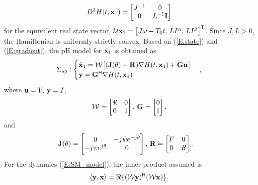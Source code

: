 \begin{equation} \label{E:sg_hessian}
    D^2 H(t, \mathbf{x}_1) = \begin{bmatrix}
        J^{-1} &0 \\
        0 &L^{-1} \mathbf{I}
    \end{bmatrix}
\end{equation}
for the equivalent real state vector, $\mathcal U \mathbf{x}_1 = \big[ J\omega - T_0 t,\, L I^\alpha,\, L I^\beta \big]^{\mathsf{T}}$. Since $J, L > 0$, the Hamiltonian is uniformly strictly convex.
Based on (\ref{E:state}) and (\ref{E:gradient}), the pH model for $\mathbf{x}_1$ is obtained as
\begin{equation} \label{E:SM_model}
    \Sigma_{sg}: \begin{cases}
        \dot{\mathbf{x}}_1 = \mathcal W \big[ (\mathbf{J}(\theta) - \mathbf{R}) \nabla H(t, \mathbf{x}_1) + \mathbf{G} \mathbf{u} \big] \\
    \mathbf{y} = \mathbf{G}^{\mathsf{H}} \nabla H(t, \mathbf{x}_1)
    \end{cases},
\end{equation}
where $\mathbf{u} = V,\, \mathbf{y} = I$,
\begin{equation*}
    \mathcal W = \begin{bmatrix}
        \Re &0 \\
        0 &1
    \end{bmatrix},\, \mathbf{G} = \begin{bmatrix}
        0 \\
        1
    \end{bmatrix},
\end{equation*}
and 
\begin{align*}
    &\mathbf{J}(\theta) = \begin{bmatrix}
        0 &-j \psi e^{-j\theta} \\
        -j \psi e^{j\theta} &0
    \end{bmatrix},\, \mathbf{R} = \begin{bmatrix}
        F &0 \\
        0 &R
    \end{bmatrix}.
\end{align*}
For the dynamics (\ref{E:SM_model}), the inner product assumed is
\begin{equation*}
    \langle \mathbf{y}, \mathbf{x} \rangle = \Re\{ (\mathcal W \mathbf{y})^{\mathsf{H}} (\mathcal W \mathbf{x}) \}. 
\end{equation*}

